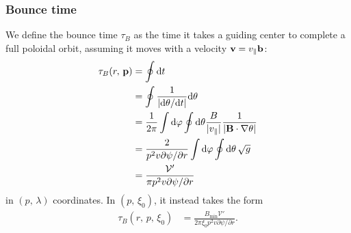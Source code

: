 \documentclass[11pt,a4paper]{article}
\newcommand{\rd}{\ensuremath{\mathrm{d}}}
\newcommand{\sub}[1]{\ensuremath{_{\text{#1}}}}
\renewcommand{\b}[1]{\ensuremath{ {\bf #1 } }}
\begin{document}
\subsubsection*{Bounce time}
We define the bounce time $\tau_B$ as the time it takes a guiding center to complete a full poloidal orbit, assuming it moves with a velocity $\b{v} = v_\parallel \b{b}$:
\begin{align}
\tau_B(r, \,\b{p}) &= \oint \rd t \nonumber \\
&= \oint \frac{1}{|\rd \theta/\rd t|} \rd \theta \nonumber \\
&= \frac{1}{2\pi} \int \rd \varphi \oint \rd\theta \frac{B}{|v_\parallel|}\frac{1}{|\b{B}\cdot \nabla \theta |}  \nonumber \\
&= \frac{2}{p^2v \partial \psi/\partial r} \int \rd \varphi \oint \rd\theta  \,  \sqrt{g} \nonumber \\
&= \frac{\mathcal{V}'}{\pi p^2 v \partial \psi/\partial r}
\end{align}
in $(p,\,\lambda)$ coordinates. In $(p,\,\xi_0)$, it instead takes the form
\begin{align}
\tau_B(r,\,p,\,\xi_0) &= \frac{B\sub{min}\mathcal{V}'}{2\pi  \xi_0  p^2 v \partial \psi/\partial r}.
\end{align}
\end{document}

